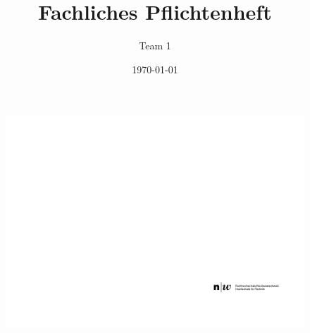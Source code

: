 \documentclass[final]{fhnwreport}       %
\title{Fachliches Pflichtenheft}  		        %
\author{Team 1}      				    %
\date{\today}          				   %
\begin{document}
\thispagestyle{empty}
	\begin{figure}
		 \vspace*{-\topskip}\vspace*{-\headsep}
		\includegraphics[scale=1]{graphics/fhnw_ht_logo_de.pdf}
	\end{figure}
\end{document}
